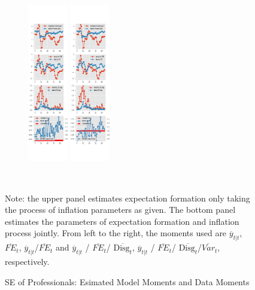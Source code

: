 \documentclass[]{article}
\begin{document}
\begin{figure}[ht]
\begin{subfigure}[b]{\textwidth}
	\includegraphics[width=0.19\textwidth]{figures/spf_se_est_joint_diag3.png}
	\includegraphics[width=0.19\textwidth]{figures/spf_se_est_joint_diag4.png}
	\end{subfigure}
	\\
	\begin{flushleft}
		{\footnotesize Note: the upper panel estimates expectation formation only taking the process of inflation parameters as given. The bottom panel estimates the parameters of expectation formation and inflation process jointly. From left to the right, the moments used are $\overline y_{t|t}$, $\overline{FE}_{t}$, $\overline y_{t|t}$/$\overline{FE}_{t}$ and $\overline y_{t|t}$ / $\overline{FE}_{t}$/ $\overline{\textrm{Disg}_t}$, $\overline y_{t|t}$ / $\overline{FE}_{t}$/ $\overline{\textrm{Disg}_t}$/$\overline{Var}_t$,  respectively. }
	\end{flushleft}
	\caption{SE of Professionals: Esimated Model Moments and Data Moments}
\end{figure}
\end{document}
